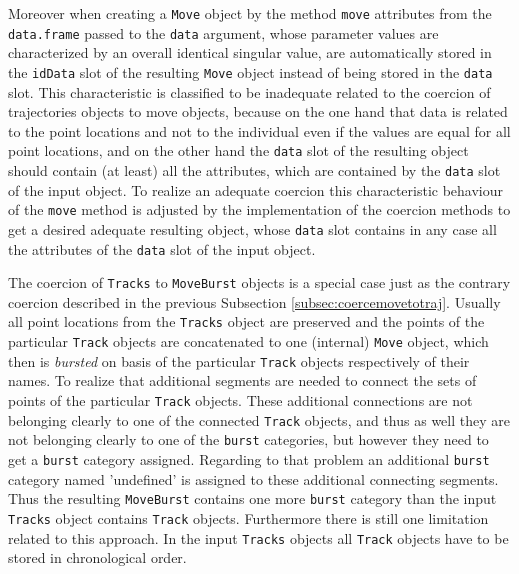 \documentclass[12pt, oneside, a4paper]{scrbook}
\newcommand{\pkg}[1]{{\normalfont\fontseries{b}\selectfont #1}}
\let\code=\texttt
\begin{document}
Moreover when creating a \code{Move} object by the method \code{move} attributes from the \code{data.frame}  passed to the \code{data} argument, whose parameter values are characterized by an overall identical singular value, are automatically stored in the \code{idData} slot of the resulting \code{Move} object instead of being stored in the \code{data} slot.
This characteristic is classified to be inadequate related to the coercion of \pkg{trajectories} objects to \pkg{move} objects, because on the one hand that data is related to the point locations and not to the individual even if the values are equal for all point locations, and on the other hand the \code{data} slot of the resulting object should contain (at least) all the attributes, which are contained by the \code{data} slot of the input object.
To realize an adequate coercion this characteristic behaviour of the \code{move} method is adjusted by the implementation of the coercion methods to get a desired adequate resulting object, whose \code{data} slot contains in any case all the attributes of the \code{data} slot of the input object.

\par\medskip

The coercion of \code{Tracks} to \code{MoveBurst} objects is a special case just as the contrary coercion described in the previous Subsection \ref{subsec:coercemovetotraj}.
Usually all point locations from the \code{Tracks} object are preserved and the points of the particular \code{Track} objects are concatenated to one (internal) \code{Move} object, which then is \textit{bursted} on basis of the particular \code{Track} objects respectively of their names. 
To realize that additional segments are needed to connect the sets of points of the particular \code{Track} objects.
These additional connections are not belonging clearly to one of the connected \code{Track} objects, and thus as well they are not belonging clearly to one of the \code{burst} categories, but however they need to get a \code{burst} category assigned.
Regarding to that problem an additional \code{burst} category named 'undefined' is assigned to these additional connecting segments. 
Thus the resulting \code{MoveBurst} contains one more \code{burst} category than the input \code{Tracks} object contains \code{Track} objects. 
Furthermore there is still one limitation related to this approach. In the input \code{Tracks} objects all \code{Track} objects have to be stored in chronological order.
\par\medskip
\end{document}
